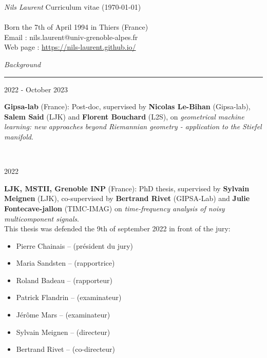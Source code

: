 \documentclass[a4paper,10pt]{article}
\begin{document}
	\noindent
	\textit{\Large \color{Black} Nils Laurent} \hfill {Curriculum vitae (\today)}\\
	\vspace{0mm}\\
	Born the 7th of April 1994 in Thiers (France)\\
	Email : nils.laurent@univ-grenoble-alpes.fr\\
	Web page : \url{https://nils-laurent.github.io/}\\
	\vspace{5mm}
	
	\noindent
	\textit{\Large \color{MyGray} \hspace{5mm} Background}
	\vspace{2mm}
	{\color{DefaultGray}\hrule height .1pt}
	\vspace{4mm}
	
	\noindent
	\begin{minipage}{0.20\textwidth}
		\color{MyGray} 2022 - October 2023
	\end{minipage}
	\hfill
	\begin{minipage}{0.70\textwidth}
		\textbf{Gipsa-lab} (France): Post-doc, supervised by \textbf{Nicolas Le-Bihan} (Gipsa-lab), \textbf{Salem Said} (LJK) and \textbf{Florent Bouchard} (L2S), on \emph{geometrical machine learning: new approaches beyond Riemannian geometry - application to the Stiefel manifold}.
	\end{minipage}\\
	\vspace{2mm}
	
	\noindent
	\begin{minipage}{0.20\textwidth}
		\color{MyGray} 2022
	\end{minipage}
	\hfill
	\begin{minipage}{0.70\textwidth}
		\textbf{LJK, MSTII, Grenoble INP} (France): PhD thesis, supervised by \textbf{Sylvain Meignen} (LJK), co-supervised by \textbf{Bertrand Rivet} (GIPSA-Lab) and \textbf{Julie Fontecave-jallon} (TIMC-IMAG) on \emph{time-frequency analysis of noisy multicomponent signals}.\\
		This thesis was defended the 9th of september 2022 in front of the jury:
		\begin{itemize}
			\item[] Pierre Chainais -- (président du jury)
			\item[] Maria Sandsten -- (rapportrice)
			\item[] Roland Badeau -- (rapporteur)
			\item[] Patrick Flandrin -- (examinateur)
			\item[] Jérôme Mars -- (examinateur)
			\item[] Sylvain Meignen -- (directeur)
			\item[] Bertrand Rivet -- (co-directeur)
		\end{itemize}
	\end{minipage}\\
	\vspace{2mm}
	
\end{document}

